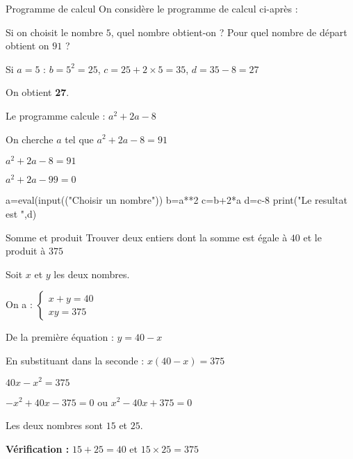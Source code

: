 \vspace{-1mm}
\def\rdifficulty{1.5}
\begin{EXO}{Programme de calcul}{}
On considère le programme de calcul ci-après :

\begin{tcbenumerate}[2]
\tcbitem {} Si on choisit le nombre $5$, quel nombre obtient-on ?
\tcbitem {} Pour quel nombre de départ obtient on $91$ ?
\end{tcbenumerate}
\exocorrection

\begin{tcbenumerate}[1]
\tcbitem Si $a=5$ : $b=5^2=25$, $c=25+2 \times 5 = 35$, $d=35-8=27$

On obtient \textbf{27}.

\tcbitem Le programme calcule : $a^2 + 2a - 8$

On cherche $a$ tel que $a^2 + 2a - 8 = 91$

$a^2 + 2a - 8 = 91$

$a^2 + 2a - 99 = 0$

\end{tcbenumerate}
\end{EXO}
\begin{CodePiton}{}
a=eval(input(("Choisir un nombre"))
b=a**2
c=b+2*a
d=c-8
print("Le resultat est ",d)
\end{CodePiton}


\def\rdifficulty{2}
\begin{EXO}{Somme et produit}{}
Trouver deux entiers dont la somme est égale à $40$ et le produit à $375$

\exocorrection

Soit $x$ et $y$ les deux nombres.

On a : $\begin{cases} x + y = 40 \\ xy = 375 \end{cases}$

De la première équation : $y = 40 - x$

En substituant dans la seconde : $x(40-x) = 375$

$40x - x^2 = 375$

$-x^2 + 40x - 375 = 0$ ou $x^2 - 40x + 375 = 0$


Les deux nombres sont $15$ et $25$.

\textbf{Vérification :} $15 + 25 = 40$ et $15 \times 25 = 375$ \checkmark
\end{EXO}

